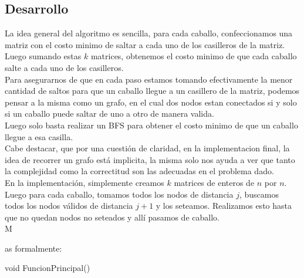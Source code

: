 {\subsection{Desarrollo}
La idea general del algoritmo es sencilla, para cada caballo, confeccionamos una matriz con el costo minimo de saltar a cada uno de los casilleros de la matriz. Luego sumando estas $k$ matrices, obtenemos el costo minimo de que cada caballo salte a cada uno de los casilleros.
\\
Para asegurarnos de que en cada paso estamos tomando efectivamente la menor cantidad de saltos para que un caballo llegue a un casillero de la matriz, podemos pensar a la misma como un grafo, en el cual dos nodos estan conectados si y solo si un caballo puede saltar de uno a otro de manera valida.
\\
Luego solo basta realizar un BFS para obtener el costo minimo de que un caballo llegue a esa casilla.
\\
Cabe destacar, que por una cuesti\'on de claridad, en la implementacion final, la idea de recorrer un grafo est\'a implicita, la misma solo nos ayuda a ver que tanto la complejidad como la correctitud son las adecuadas en el problema dado.
\\
En la implementación, simplemente creamos $k$ matrices de enteros de $n$ por $n$. Luego para cada caballo, tomamos todos los nodos de distancia $j$, buscamos todos los nodos válidos de distancia $j+1$ y los seteamos. Realizamos esto hasta que no quedan nodos no seteados y all\'i pasamos de caballo.
\\
M{as formalmente:

\begin{algorithm}
\begin{algorithmic}[1]\parskip=1mm
\caption{void FuncionPrincipal()}


  
  





\end{algorithmic}
\end{algorithm}}}
